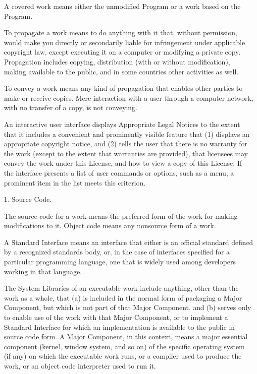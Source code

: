 \documentclass[letterpaper,10pt,english]{sphinxmanual}
\begin{document}
\begin{sphinxVerbatim}[commandchars=\\\{\}]
  A \PYGZdq{}covered work\PYGZdq{} means either the unmodified Program or a work based
on the Program.

  To \PYGZdq{}propagate\PYGZdq{} a work means to do anything with it that, without
permission, would make you directly or secondarily liable for
infringement under applicable copyright law, except executing it on a
computer or modifying a private copy.  Propagation includes copying,
distribution (with or without modification), making available to the
public, and in some countries other activities as well.

  To \PYGZdq{}convey\PYGZdq{} a work means any kind of propagation that enables other
parties to make or receive copies.  Mere interaction with a user through
a computer network, with no transfer of a copy, is not conveying.

  An interactive user interface displays \PYGZdq{}Appropriate Legal Notices\PYGZdq{}
to the extent that it includes a convenient and prominently visible
feature that (1) displays an appropriate copyright notice, and (2)
tells the user that there is no warranty for the work (except to the
extent that warranties are provided), that licensees may convey the
work under this License, and how to view a copy of this License.  If
the interface presents a list of user commands or options, such as a
menu, a prominent item in the list meets this criterion.

  1. Source Code.

  The \PYGZdq{}source code\PYGZdq{} for a work means the preferred form of the work
for making modifications to it.  \PYGZdq{}Object code\PYGZdq{} means any non\PYGZhy{}source
form of a work.

  A \PYGZdq{}Standard Interface\PYGZdq{} means an interface that either is an official
standard defined by a recognized standards body, or, in the case of
interfaces specified for a particular programming language, one that
is widely used among developers working in that language.

  The \PYGZdq{}System Libraries\PYGZdq{} of an executable work include anything, other
than the work as a whole, that (a) is included in the normal form of
packaging a Major Component, but which is not part of that Major
Component, and (b) serves only to enable use of the work with that
Major Component, or to implement a Standard Interface for which an
implementation is available to the public in source code form.  A
\PYGZdq{}Major Component\PYGZdq{}, in this context, means a major essential component
(kernel, window system, and so on) of the specific operating system
(if any) on which the executable work runs, or a compiler used to
produce the work, or an object code interpreter used to run it.


\end{sphinxVerbatim}
\end{document}
